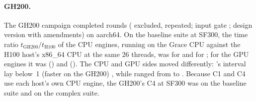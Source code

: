 \documentclass[11pt]{article}
\begin{document}
\paragraph{GH200.} The GH200 campaign completed
 rounds ( excluded,
 repeated; input gate ; design
version \texttt{} with
 amendments) on aarch64.
On the baseline suite at SF300, the time ratio
$t_{\mathrm{GH200}}/t_{\mathrm{H100}}$ of the CPU engines, running on the
Grace CPU against the H100 host's x86\_64 CPU at the same 26 threads, was
 for \polarscpu{} and
 for \sparkcpu{}; for the
GPU engines it was 
(\polarsgpu{}) and 
(\sparkgpu{}). The CPU and GPU sides moved differently: \polarscpu{}'s
interval lay below~1 (faster on the GH200)
, while
\polarsgpu{} ranged from  to
. Because C1 and C4 use each host's
own CPU engine, the GH200's C4 at SF300 was
 on the baseline suite and
 on the complex suite.
\fi
\ifbtwohundredran
\end{document}

